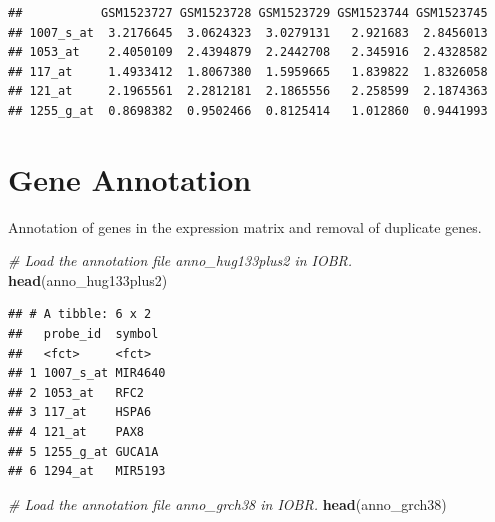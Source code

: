 \documentclass[
  12pt,
]{book}
\newenvironment{Shaded}{\begin{snugshade}}{\end{snugshade}}
\newcommand{\CommentTok}[1]{\textcolor[rgb]{0.56,0.35,0.01}{\textit{#1}}}
\newcommand{\FunctionTok}[1]{\textcolor[rgb]{0.13,0.29,0.53}{\textbf{#1}}}
\newcommand{\NormalTok}[1]{#1}
\begin{document}
\begin{verbatim}
##           GSM1523727 GSM1523728 GSM1523729 GSM1523744 GSM1523745
## 1007_s_at  3.2176645  3.0624323  3.0279131   2.921683  2.8456013
## 1053_at    2.4050109  2.4394879  2.2442708   2.345916  2.4328582
## 117_at     1.4933412  1.8067380  1.5959665   1.839822  1.8326058
## 121_at     2.1965561  2.2812181  2.1865556   2.258599  2.1874363
## 1255_g_at  0.8698382  0.9502466  0.8125414   1.012860  0.9441993
\end{verbatim}

\hypertarget{gene-annotation}{%
\section{Gene Annotation}\label{gene-annotation}}

Annotation of genes in the expression matrix and removal of duplicate genes.

\begin{Shaded}
\begin{Highlighting}[]
\CommentTok{\# Load the annotation file \textasciigrave{}anno\_hug133plus2\textasciigrave{} in IOBR.}
\FunctionTok{head}\NormalTok{(anno\_hug133plus2)}
\end{Highlighting}
\end{Shaded}

\begin{verbatim}
## # A tibble: 6 x 2
##   probe_id  symbol 
##   <fct>     <fct>  
## 1 1007_s_at MIR4640
## 2 1053_at   RFC2   
## 3 117_at    HSPA6  
## 4 121_at    PAX8   
## 5 1255_g_at GUCA1A 
## 6 1294_at   MIR5193
\end{verbatim}

\begin{Shaded}
\begin{Highlighting}[]
\CommentTok{\# Load the annotation file \textasciigrave{}anno\_grch38\textasciigrave{} in IOBR.}
\FunctionTok{head}\NormalTok{(anno\_grch38)}
\end{Highlighting}
\end{Shaded}
\end{document}
